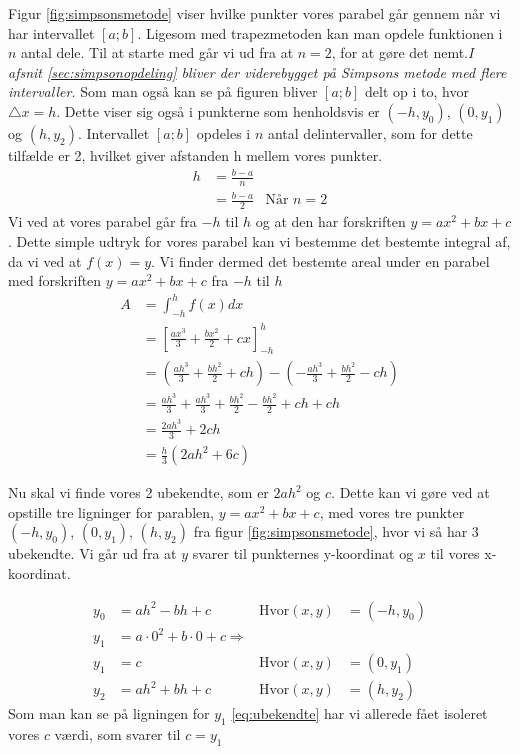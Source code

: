 \documentclass[12pt]{article}
\numberwithin{equation}{section}
\begin{document}
Figur \ref{fig:simpsonsmetode} viser hvilke punkter vores parabel går gennem når vi har intervallet $[a;b]$. Ligesom med trapezmetoden kan man opdele funktionen i $n$ antal dele. Til at starte med går vi ud fra at $n=2$, for at gøre det nemt.\emph{I afsnit \ref{sec:simpsonopdeling} bliver der viderebygget på Simpsons metode med flere intervaller.}
Som man også kan se på figuren bliver $[a;b]$ delt op i to, hvor $\triangle x=h$. Dette viser sig også i punkterne som henholdsvis er $(-h,y_0)$, $(0,y_1)$ og $(h,y_2)$. Intervallet $[a;b]$ opdeles i $n$ antal delintervaller, som for dette tilfælde er 2, hvilket giver afstanden h mellem vores punkter.
\begin{align}
h &= \frac{b-a}{n} \nonumber
\\&= \frac{b-a}{2} &\text{Når } n=2
\end{align}
Vi ved at vores parabel går fra $-h$ til $h$ og at den har forskriften $y=ax^2+bx+c$. Dette simple udtryk for vores parabel kan vi bestemme det bestemte integral af, da vi ved at $f(x)=y$. Vi finder dermed det bestemte areal under en parabel med forskriften $y=ax^2+bx+c$ fra $-h$ til $h$
\begin{align}
\label{eq:integral-hh}
A &=\int_{-h}^{h}f(x)dx \nonumber
\\ &=\left[ \frac{ax^3}{3} + \frac{bx^2}{2} + cx \right]_{-h}^{h} \nonumber
\\ &= \left( \frac{ah^3}{3} + \frac{bh^2}{2} + ch \right) - \left( -\frac{ah^3}{3} + \frac{bh^2}{2} - ch \right) \nonumber
\\ &= \frac{ah^3}{3} + \frac{ah^3}{3} + \frac{bh^2}{2} - \frac{bh^2}{2} + ch + ch \nonumber
\\ &= \frac{2ah^3}{3} + 2ch \nonumber
\\ &= \frac{h}{3}(2ah^2+6c)
\end{align}

Nu skal vi finde vores 2 ubekendte, som er $2ah^2$ og $c$. Dette kan vi gøre ved at opstille tre ligninger for parablen, $y=ax^2+bx+c$, med vores tre punkter $(-h,y_0)$, $(0,y_1)$, $(h,y_2)$ fra figur \ref{fig:simpsonsmetode}, hvor vi så har 3 ubekendte. Vi går ud fra at $y$ svarer til punkternes y-koordinat og $x$ til vores x-koordinat.

\begin{align}
\label{eq:ubekendte}
y_0 &= ah^2-bh+c & \text{Hvor} (x,y) &=(-h,y_0)
\\ y_1 &= a \cdot 0^2+b \cdot 0 +c \Rightarrow \nonumber
\\ y_1 &= c & \text{Hvor} (x,y) &=(0,y_1)
\\ y_2 &= ah^2+bh+c & \text{Hvor} (x,y) &=(h,y_2)
\end{align}
Som man kan se på ligningen for $y_1$ \eqref{eq:ubekendte} har vi allerede fået isoleret vores $c$ værdi, som svarer til $c=y_1$
\end{document}
